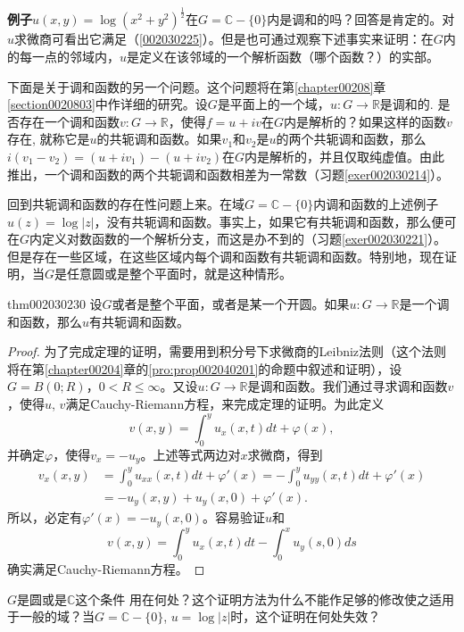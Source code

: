 \textbf{例子}\quad $u(x, y) = \log{(x^2+y^2)^{\frac{1}{2}}}$在$G = \mathbb{C} - \{0\}$内是调和的吗？回答是肯定的。对$u$求微商可看出它满足（\ref{002030225}）。但是也可通过观察下述事实来证明：在$G$内的每一点的邻域内，$u$是定义在该邻域的一个解析函数（哪个函数？）的实部。

下面是关于调和函数的另一个问题。这个问题将在第\ref{chapter00208}章\ref{section0020803}中作详细的研究。设$G$是平面上的一个域，$u: G \to \mathbb{R}$是调和的. 是否存在一个调和函数$v: G \to \mathbb{R}$，使得$f = u+iv$在$G$内是解析的？如果这样的函数$v$存在, 就称它是$u$的共轭调和函数。如果$v_1$和$v_2$是$u$的两个共轭调和函数，那么$i(v_1-v_2) = (u+iv_1)-(u+iv_2)$在$G$内是解析的，并且仅取纯虚值。由此推出，一个调和函数的两个共轭调和函数相差为一常数（习题\ref{exer002030214}）。

回到共轭调和函数的存在性问题上来。在域$G = \mathbb{C} - \{0\}$内调和函数的上述例子$u(z) = \log{|z|}$，没有共轭调和函数。事实上，如果它有共轭调和函数，那么便可在$G$内定义对数函数的一个解析分支，而这是办不到的（习题\ref{exer002030221}）。但是存在一些区域，在这些区域内每个调和函数有共轭调和函数。特别地，现在证明，当$G$是任意圆或是整个平面时，就是这种情形。
\begin{theorem}{}{thm002030230}
设$G$或者是整个平面，或者是某一个开圆。如果$u: G \to \mathbb{R}$是一个调和函数，那么$u$有共轭调和函数。
\end{theorem}

\begin{proof}
为了完成定理的证明，需要用到积分号下求微商的Leibniz法则（这个法则将在第\ref{chapter00204}章的\ref{pro:prop002040201}的命题中叙述和证明），设$G = B(0; R)$，$0 < R \le \infty$。又设$u : G \to \mathbb{R}$是调和函数。我们通过寻求调和函数$v$，使得$u$, $v$满足Cauchy-Riemann方程，来完成定理的证明。为此定义
\[
v(x,y) = \int_{0}^{y}{u_x(x, t)dt} + \varphi(x),
\]
并确定$\varphi$，使得$v_x = -u_y$。上述等式两边对$x$求微商，得到
\[
\begin{aligned}
v_x(x, y) &= \int_{0}^{y}{u_{xx}(x, t)dt} + \varphi'(x) = -\int_{0}^{y}{u_{yy}(x, t)dt} + \varphi'(x)\\
&= -u_y(x, y) + u_y(x, 0) + \varphi'(x).
\end{aligned}
\]
所以，必定有$\varphi'(x) = -u_y(x, 0)$。容易验证$u$和
\[
v(x, y) = \int_{0}^{y}{u_x(x, t)dt} - \int_{0}^{x}{u_y(s, 0)ds}
\]
确实满足Cauchy-Riemann方程。
\end{proof}

$G$是圆或是$\mathbb{C}$这个条件 用在何处？这个证明方法为什么不能作足够的修改使之适用于一般的域？当$G = \mathbb{C} - \{0\}$, $u = \log{|z|}$时，这个证明在何处失效？


